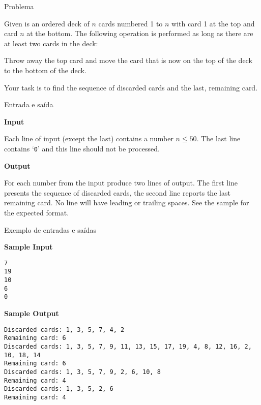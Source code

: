 
\begin{frame}[fragile]{Problema}

Given is an ordered deck of $n$ cards numbered 1 to
$n$ with card 1 at the top and card $n$ at the bottom.
The following operation is performed as long as there
are at least two cards in the deck:

\begin{center}
Throw away the top card and move the
card that is now on the top of the deck to
the bottom of the deck.
\end{center}

Your task is to find the sequence of discarded
cards and the last, remaining card.

\end{frame}

\begin{frame}[fragile]{Entrada e saída}

\textbf{Input}

Each line of input (except the last) contains a number
$n\leq 50$. The last line contains ‘\texttt{0}’ and this line should
not be processed.

\textbf{Output}

For each number from the input produce two lines of
output. The first line presents the sequence of discarded cards, the second line reports the last remaining card. No line will have leading or trailing spaces.
See the sample for the expected format.
\end{frame}

\begin{frame}[fragile]{Exemplo de entradas e saídas}

\begin{footnotesize}
\textbf{Sample Input}
\begin{verbatim}
7
19
10
6
0
\end{verbatim}

\textbf{Sample Output}
\begin{verbatim}
Discarded cards: 1, 3, 5, 7, 4, 2
Remaining card: 6
Discarded cards: 1, 3, 5, 7, 9, 11, 13, 15, 17, 19, 4, 8, 12, 16, 2, 10, 18, 14
Remaining card: 6
Discarded cards: 1, 3, 5, 7, 9, 2, 6, 10, 8
Remaining card: 4
Discarded cards: 1, 3, 5, 2, 6
Remaining card: 4
\end{verbatim}
\end{footnotesize}

\end{frame}

